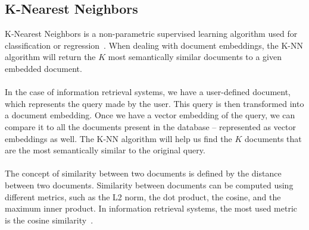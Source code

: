 \subsection{K-Nearest Neighbors}\label{subsec:k-nearest-neighbors}
K-Nearest Neighbors is a non-parametric supervised learning algorithm used for classification or regression~\cite{cover_nearest_1967}.
When dealing with document embeddings, the K-NN algorithm will return the $K$ most semantically similar documents to a given embedded document. \\ \\
In the case of information retrieval systems, we have a user-defined document, which represents the query made by the user.
This query is then transformed into a document embedding.
Once we have a vector embedding of the query, we can compare it to all the documents present in the database -- represented as vector embeddings as well.
The K-NN algorithm will help us find the $K$ documents that are the most semantically similar to the original query. \\ \\
The concept of similarity between two documents is defined by the distance between two documents.
Similarity between documents can be computed using different metrics, such as the L2 norm, the dot product, the cosine, and the maximum inner product.
In information retrieval systems, the most used metric is the cosine similarity~\cite{guo_testing_2022}.
